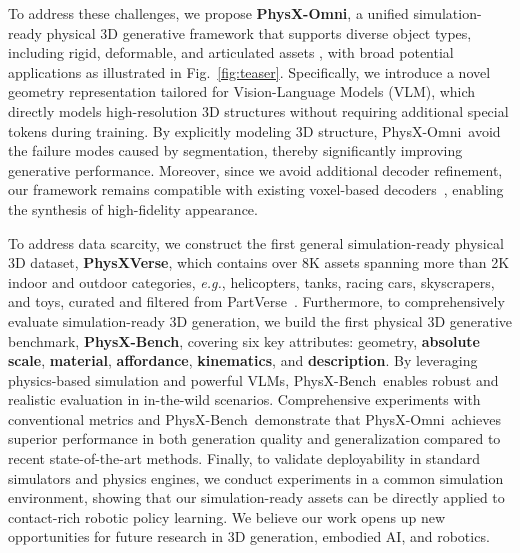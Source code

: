 \documentclass[11pt]{article}
\def\ourname{PhysX-Omni}
\def\ournewdata{PhysXVerse}
\def\ourbench{PhysX-Bench}
\begin{document}
To address these challenges, we propose \textbf{\ourname}, a unified simulation-ready physical 3D generative framework that supports diverse object types, including rigid, deformable, and articulated assets , with broad potential applications as illustrated in Fig.~\ref{fig:teaser}. Specifically, we introduce a novel geometry representation tailored for Vision-Language Models (VLM), which directly models high-resolution 3D structures without requiring additional special tokens during training. By explicitly modeling 3D structure, \ourname\ avoid the failure modes caused by segmentation, thereby significantly improving generative performance. Moreover, since we avoid additional decoder refinement, our framework remains compatible with existing voxel-based decoders~\cite{trellis,trellis2,ren2024xcube}, enabling the synthesis of high-fidelity appearance. 

To address data scarcity, we construct the first general simulation-ready physical 3D dataset, \textbf{\ournewdata}, which contains over 8K assets spanning more than 2K indoor and outdoor categories, \textit{e.g.}, helicopters, tanks, racing cars, skyscrapers, and toys, curated and filtered from PartVerse~\cite{dong2025one}. Furthermore, to comprehensively evaluate simulation-ready 3D generation, we build the first physical 3D generative benchmark, \textbf{\ourbench}, covering six key attributes: geometry, \textbf{\textcolor{color2}{absolute scale}}, \textbf{\textcolor{color3}{material}}, \textbf{\textcolor{color1}{affordance}}, \textbf{\textcolor{color4}{kinematics}}, and \textbf{\textcolor{color5}{description}}. By leveraging physics-based simulation and powerful VLMs, \ourbench\ enables robust and realistic evaluation in in-the-wild scenarios. Comprehensive experiments with conventional metrics and \ourbench\ demonstrate that \ourname\ achieves superior performance in both generation quality and generalization compared to recent state-of-the-art methods. Finally, to validate deployability in standard simulators and physics engines, we conduct experiments in a common simulation environment, showing that our simulation-ready assets can be directly applied to contact-rich robotic policy learning. We believe our work opens up new opportunities for future research in 3D generation, embodied AI, and robotics.
\end{document}
